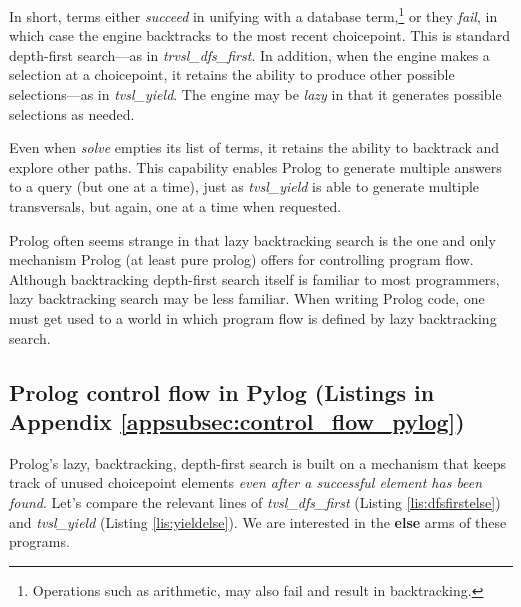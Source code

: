 In short, terms either \textit{succeed} in unifying with a database term,\footnote{Operations such as arithmetic, may also fail and result in backtracking.} or they \textit{fail}, in which case the engine backtracks to the most recent choicepoint. This is standard depth-first search---as in \textit{trvsl\_dfs\_first}. In addition, when the engine makes a selection at a choicepoint, it retains the ability to produce other possible selections---as in \textit{tvsl\_yield}. The engine may be \textit{lazy} in that it generates possible selections as needed. 

Even when \textit{solve} empties its list of terms, it retains the ability to backtrack and explore other paths. This capability enables Prolog to generate multiple answers to a query (but one at a time), just as \textit{tvsl\_yield} is able to generate multiple transversals, but again, one at a time when requested.

Prolog often seems strange in that lazy backtracking search is the one and only mechanism Prolog (at least pure prolog) offers for controlling program  flow. Although backtracking depth-first search itself is familiar to most programmers, lazy backtracking search may be less familiar. When writing Prolog code, one must get used to a world in which program flow is defined by lazy backtracking search.

\subsection{Prolog control flow in Pylog (Listings in Appendix \ref{appsubsec:control_flow_pylog})} \label{subsec:control_flow_pylog}

Prolog's lazy, backtracking, depth-first search is built on a mechanism that keeps track of unused choicepoint elements \textit{even after a successful element has been found}. Let's compare the relevant lines of \textit{tvsl\_dfs\_first} (Listing \ref{lis:dfsfirstelse}) and \textit{tvsl\_yield} (Listing \ref{lis:yieldelse}). We are interested in the \textbf{else} arms of these programs.




